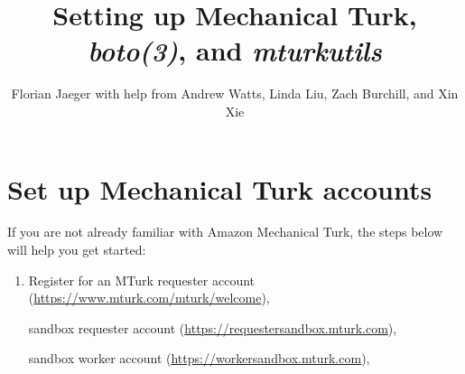 \documentclass{article}
\title{Setting up Mechanical Turk, {\em boto(3)}, and {\em mturkutils}}
\author{Florian Jaeger with help from Andrew Watts, Linda Liu, Zach Burchill, and Xin Xie}
\begin{document}
\maketitle

\tableofcontents 

\section{Set up Mechanical Turk accounts}

If you are not already familiar with Amazon Mechanical Turk, the steps below will help you get started:

\begin{enumerate}
    \item Register for an MTurk requester account (\href{https://www.mturk.com/mturk/welcome}{https://www.mturk.com/mturk/welcome}),
    
    sandbox requester account (\href{https://requestersandbox.mturk.com}{https://requestersandbox.mturk.com}), 
    
    sandbox worker account (\href{https://workersandbox.mturk.com}{https://workersandbox.mturk.com}),
    

\end{enumerate}
\end{document}
